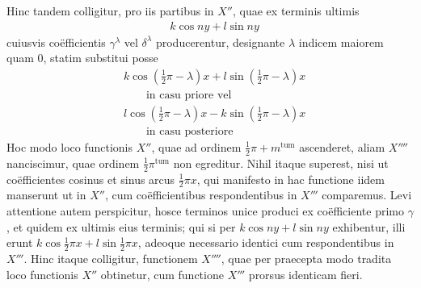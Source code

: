 Hinc tandem colligitur, pro iis partibus in $X''$, quae ex terminis ultimis
\[
\begin{aligned}
&k\cos ny+l\sin ny
\end{aligned}
\]
cuiusvis coëfficientis $\gamma^\lambda$ vel $\delta^\lambda$ producerentur,
designante $\lambda$ indicem maiorem quam 0, statim substitui posse
\[
\begin{aligned}
&k\cos(\tfrac12\pi-\lambda)x+l\sin(\tfrac12\pi-\lambda)x\\[5pt]
&\qquad\text{in casu priore vel}\\[5pt]
&l\cos(\tfrac12\pi-\lambda)x-k\sin(\tfrac12\pi-\lambda)x\\[5pt]
&\qquad\text{in casu posteriore}
\end{aligned}
\]
Hoc modo loco functionis $X''$, quae ad ordinem $\tfrac12\pi+m^{\mathrm{tum}}$
ascenderet, aliam $X''''$ nanciscimur, quae ordinem $\tfrac12\pi^{\mathrm{tum}}$
non egreditur. Nihil itaque superest, nisi ut coëfficientes cosinus et sinus arcus
$\tfrac12\pi x$, qui manifesto in hac functione iidem manserunt ut in $X''$, cum
coëfficientibus respondentibus in $X'''$ comparemus. Levi attentione autem
perspicitur, hosce terminos unice produci ex coëfficiente primo $\gamma$, et quidem
ex ultimis eius terminis; qui si per $k\cos ny+l\sin ny$ exhibentur, illi erunt
$k\cos\tfrac12\pi x+l\sin\tfrac12\pi x$, adeoque necessario identici cum
respondentibus in $X'''$. Hinc itaque colligitur, functionem $X''''$, quae per
praecepta modo tradita loco functionis $X''$ obtinetur, cum functione $X'''$
prorsus identicam fieri.

